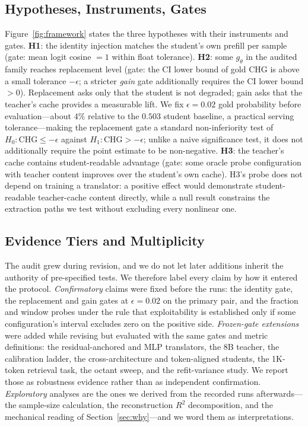 \documentclass{article} %
\newcommand{\chg}{\mathrm{CHG}}
\begin{document}
\subsection{Hypotheses, Instruments, Gates}
Figure~\ref{fig:framework} states the three hypotheses with their instruments
and gates. \textbf{H1}: the identity injection matches the student's own
prefill per sample (gate: mean logit cosine $= 1$ within float tolerance).
\textbf{H2}: some $g_\theta$ in the audited family reaches replacement level
(gate: the CI lower bound of gold CHG is above a small tolerance $-\epsilon$; a
stricter \emph{gain} gate additionally requires the CI lower bound $> 0$).
Replacement asks only that the student is not degraded; gain asks that the
teacher's cache provides a measurable lift. We fix $\epsilon = 0.02$ gold
probability before evaluation---about $4\%$ relative to the $0.503$ student
baseline, a practical serving tolerance---making the replacement gate a
standard non-inferiority test of $H_0\colon \chg \le -\epsilon$ against
$H_1\colon \chg > -\epsilon$; unlike a naive significance test, it does not
additionally require the point estimate to be non-negative. \textbf{H3}: the teacher's cache contains student-readable
advantage (gate: some oracle probe configuration with teacher content
improves over the student's own cache). H3's probe does not depend on training
a translator: a positive effect would demonstrate student-readable
teacher-cache content directly, while a null result constrains the extraction
paths we test without excluding every nonlinear one.

\subsection{Evidence Tiers and Multiplicity}
\label{sec:tiers}
The audit grew during revision, and we do not let later additions inherit the
authority of pre-specified tests. We therefore label every claim by how it
entered the protocol. \emph{Confirmatory} claims were fixed before the runs: the
identity gate, the replacement and gain gates at $\epsilon{=}0.02$ on the
primary pair, and the fraction and window probes under the rule that
exploitability is established only if some configuration's interval excludes
zero on the positive side. \emph{Frozen-gate extensions} were added while
revising but evaluated with the same gates and metric definitions: the
residual-anchored and MLP translators, the 8B teacher, the calibration ladder,
the cross-architecture and token-aligned students, the 1K-token retrieval task, the
octant sweep, and the refit-variance study. We report those as robustness
evidence rather than as independent confirmation. \emph{Exploratory} analyses
are the ones we derived from the recorded runs afterwards---the sample-size
calculation, the reconstruction $R^2$ decomposition, and the mechanical reading
of Section~\ref{sec:why}---and we word them as interpretations.
\end{document}
